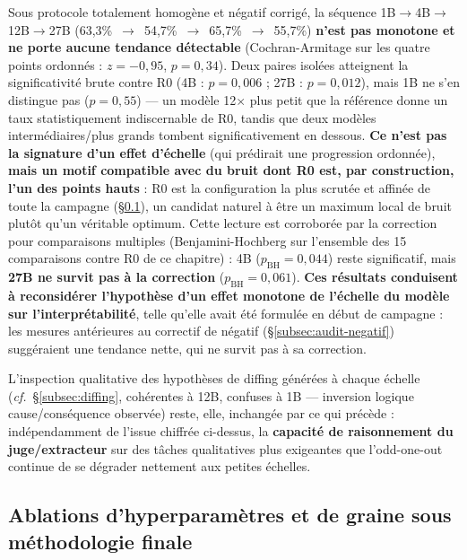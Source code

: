 \documentclass[11pt]{article}
\begin{document}
\begin{resultbox}
Sous protocole totalement homogène et négatif corrigé, la séquence
1B$\to$4B$\to$12B$\to$27B (63,3\%~$\to$~54,7\%~$\to$~65,7\%~$\to$~55,7\%)
\textbf{n'est pas monotone et ne porte aucune tendance détectable}
(Cochran-Armitage sur les quatre points ordonnés : $z=-0{,}95$,
$p=0{,}34$). Deux paires isolées atteignent la significativité brute contre
R0 (4B : $p=0{,}006$ ; 27B : $p=0{,}012$), mais 1B ne s'en distingue pas
($p=0{,}55$) --- un modèle 12$\times$ plus petit que la référence donne un
taux statistiquement indiscernable de R0, tandis que deux modèles
intermédiaires/plus grands tombent significativement en dessous. \textbf{Ce
n'est pas la signature d'un effet d'échelle} (qui prédirait une progression
ordonnée), \textbf{mais un motif compatible avec du bruit dont R0 est, par
construction, l'un des points hauts} : R0 est la configuration la plus
scrutée et affinée de toute la campagne (\S\ref{subsec:ablations-finales}),
un candidat naturel à être un maximum local de bruit plutôt qu'un véritable
optimum. Cette lecture est corroborée par la correction pour comparaisons
multiples (Benjamini-Hochberg sur l'ensemble des
15 comparaisons contre R0 de ce chapitre) : 4B ($p_\text{BH}=0{,}044$) reste
significatif, mais \textbf{27B ne survit pas à la correction}
($p_\text{BH}=0{,}061$). \textbf{Ces résultats conduisent à reconsidérer
l'hypothèse d'un effet monotone de l'échelle du modèle sur
l'interprétabilité}, telle qu'elle avait été formulée en début de campagne :
les mesures antérieures au correctif de négatif (\S\ref{subsec:audit-negatif})
suggéraient une tendance nette, qui ne survit pas à sa correction.
\end{resultbox}

L'inspection qualitative des hypothèses de diffing générées à chaque échelle
(\emph{cf.}~\S\ref{subsec:diffing}, cohérentes à 12B, confuses à 1B ---
inversion logique cause/conséquence observée) reste, elle, inchangée par ce
qui précède : indépendamment de l'issue chiffrée ci-dessus, la
\textbf{capacité de raisonnement du juge/extracteur} sur des tâches
qualitatives plus exigeantes que l'odd-one-out continue de se dégrader
nettement aux petites échelles.

\subsection{Ablations d'hyperparamètres et de graine sous méthodologie finale}
\label{subsec:ablations-finales}
\end{document}
